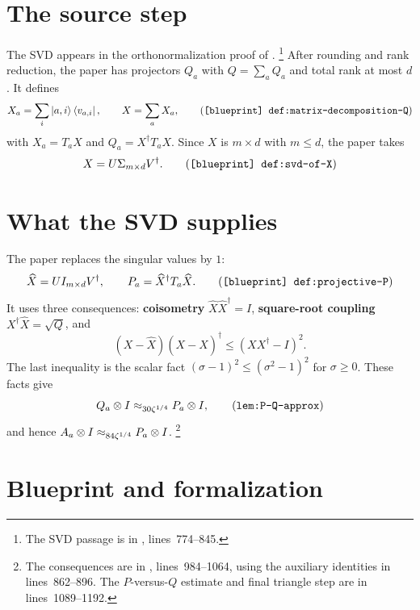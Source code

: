 \documentclass[11pt]{article}
\begin{document}
\section{The source step}

The SVD appears in the orthonormalization proof of
\cite{Ji2020LowIndividualDegree}.%
\footnote{The SVD passage is in
, lines~774--845.}
After rounding and rank reduction, the paper has projectors $Q_a$ with
$Q=\sum_aQ_a$ and total rank at most $d$.  It defines
\[
  X_a=\sum_i\ket{a,i}\bra{v_{a,i}},
  \qquad
  X=\sum_aX_a,
  \tag{\texttt{[blueprint] def:matrix-decomposition-Q}}
\]
with $X_a=T_aX$ and $Q_a=X^\dagger T_aX$.  Since $X$ is $m\times d$ with
$m\le d$, the paper takes
\[
  X=U\Sigma_{m\times d}V^\dagger.
  \tag{\texttt{[blueprint] def:svd-of-X}}
\]

\section{What the SVD supplies}

The paper replaces the singular values by $1$:
\[
  \widehat X=UI_{m\times d}V^\dagger,
  \qquad
  P_a=\widehat X^\dagger T_a\widehat X.
  \tag{\texttt{[blueprint] def:projective-P}}
\]
It uses three consequences: \textbf{coisometry}
$\widehat X\widehat X^\dagger=I$, \textbf{square-root coupling}
$X^\dagger\widehat X=\sqrt Q$, and
\[
  (X-\widehat X)(X-\widehat X)^\dagger
  \le (XX^\dagger-I)^2.
\]
The last inequality is the scalar fact $(\sigma-1)^2\le(\sigma^2-1)^2$ for
$\sigma\ge0$.  These facts give
\[
  Q_a\ot I\approx_{30\zeta^{1/4}}P_a\ot I,
  \tag{\texttt{lem:P-Q-approx}}
\]
and hence $A_a\otimes I\approx_{84\zeta^{1/4}}P_a\otimes I$.%
\footnote{The consequences are in
, lines~984--1064, using the
auxiliary identities in lines~862--896.  The $P$-versus-$Q$ estimate and final
triangle step are in lines~1089--1192.}

\section{Blueprint and formalization}
\end{document}
